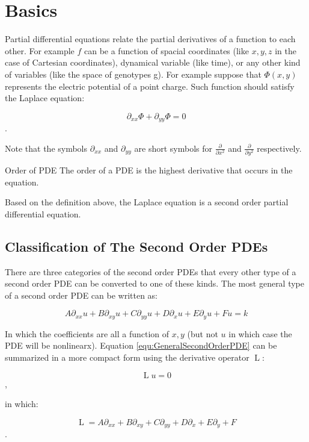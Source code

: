 \section{Basics}
Partial differential equations relate the partial derivatives of a function to each other. For example $f$ can be a function of spacial coordinates (like $x,y,z$ in the case of Cartesian coordinates), dynamical variable (like time), or any other kind of variables (like the space of genotypes g). For example suppose that $ \Phi(x,y) $ represents the electric potential of a point charge. Such function should satisfy the Laplace equation:

\[	 \partial_{xx} \Phi + \partial_{yy} \Phi = 0	\]. 

Note that the symbols $ \partial_{xx} $ and $ \partial_{yy} $ are short symbols for $ \frac{\partial}{\partial x^2} $ and $ \frac{\partial}{\partial y^2} $ respectively.

\begin{defbox}{Order of PDE}
	The order of a PDE is the highest derivative that occurs in the equation. 
\end{defbox}

Based on the definition above, the Laplace equation is a second order partial differential equation. 

\subsection{Classification of The Second Order PDEs }

There are three categories of the second order PDEs that every other type of a second order PDE can be converted to one of these kinds. The most general type of a second order PDE can be written as:

\begin{equation}
	A \partial_{xx} u + B \partial_{xy} u + C \partial_{yy} u + D \partial_{x} u + E \partial_{y} u + F u = k
	\label{equ:GeneralSecondOrderPDE}
\end{equation}

In which the coefficients are all a function of $x,y$ (but not $ u $ in which case the PDE will be nonlinearx). Equation \ref{equ:GeneralSecondOrderPDE} can be summarized in a more compact form using the derivative operator $ \operatorname{L} $: 

\[	 \operatorname{L} u = 0	\],

in which:

\[  \operatorname{L} = A \partial_{xx} + B \partial_{xy} + C \partial_{yy} + D \partial_{x} + E \partial_{y} + F \].

